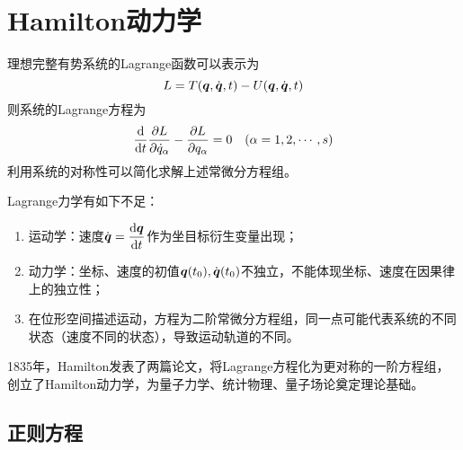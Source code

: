 \chapter{Hamilton动力学}

理想完整有势系统的Lagrange函数可以表示为
\begin{equation*}
	L = T(\boldsymbol{q},\dot{\boldsymbol{q}},t) - U(\boldsymbol{q},\dot{\boldsymbol{q}},t)
\end{equation*}
则系统的Lagrange方程为
\begin{equation*}
	\frac{\mathrm{d}}{\mathrm{d} t} \frac{\partial L}{\partial \dot{q}_\alpha} - \frac{\partial L}{\partial q_\alpha} = 0\quad (\alpha = 1,2,\cdots,s)
\end{equation*}
利用系统的对称性可以简化求解上述常微分方程组。

Lagrange力学有如下不足：
\begin{enumerate}
\item 运动学：速度$\dot{\boldsymbol{q}} = \dfrac{\mathrm{d} \boldsymbol{q}}{\mathrm{d} t}$作为坐目标衍生变量出现；
\item 动力学：坐标、速度的初值$\boldsymbol{q}(t_0),\dot{\boldsymbol{q}}(t_0)$不独立，不能体现坐标、速度在因果律上的独立性；
\item 在位形空间描述运动，方程为二阶常微分方程组，同一点可能代表系统的不同状态（速度不同的状态），导致运动轨道的不同。
\end{enumerate}

1835年，Hamilton发表了两篇论文，将Lagrange方程化为更对称的一阶方程组，创立了Hamilton动力学，为量子力学、统计物理、量子场论奠定理论基础。

\section{正则方程}


